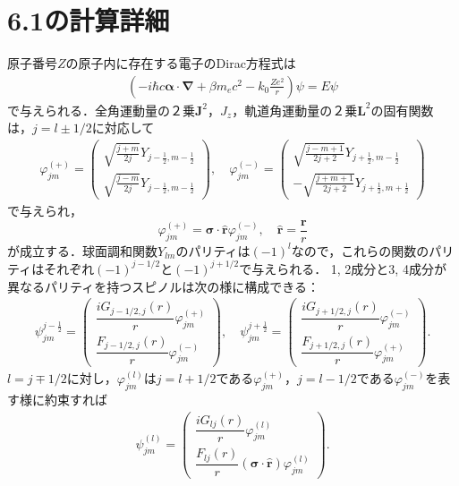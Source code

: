 \section*{6.1の計算詳細}
原子番号$Z$の原子内に存在する電子のDirac方程式は
\begin{align}
  \left( - i\hbar c\boldsymbol{\alpha}\cdot\boldsymbol{\nabla} + \beta m_ec^2 - k_0\frac{Ze^2}{r}\right)\psi=E\psi
  \label{Dirac_eq}
\end{align}
で与えられる．全角運動量の２乗$\boldsymbol{J}^2$，$J_z$，軌道角運動量の２乗$\boldsymbol{L}^2$の固有関数は，$j=l\pm 1/2$に対応して
\begin{align}
  \varphi_{jm}^{( + )} =
  \begin{pmatrix}
    \sqrt{\frac{j + m}{2j}}Y_{j - \frac{1}{2},m - \frac{1}{2}}\\
    \sqrt{\frac{j - m}{2j}}Y_{j - \frac{1}{2},m - \frac{1}{2}}
  \end{pmatrix}
  ,\quad\varphi_{jm}^{( - )} =
  \begin{pmatrix}
    \sqrt{\frac{j - m + 1}{2j + 2}}Y_{j + \frac{1}{2},m - \frac{1}{2}}\\
     - \sqrt{\frac{j + m + 1}{2j + 2}}Y_{j + \frac{1}{2},m + \frac{1}{2}}
  \end{pmatrix}
  \label{eigenfunc}
\end{align}
で与えられ，
\[\varphi_{jm}^{( + )} = \boldsymbol{\sigma}\cdot\hat{\boldsymbol{r}}\varphi_{jm}^{( - )}, \quad\hat{\boldsymbol{r}} = \frac{\boldsymbol{r}}{r}\]
が成立する．球面調和関数$Y_{lm}$のパリティは$( - 1)^l$なので，これらの関数のパリティはそれぞれ$( - 1)^{j - 1/2}$と$( - 1)^{j + 1/2}$で与えられる．
1, 2成分と3, 4成分が異なるパリティを持つスピノルは次の様に構成できる：
\begin{align}
  \psi_{jm}^{j - \frac{1}{2}}=
  \begin{pmatrix}
    \dfrac{iG_{j - 1/2,j}(r)}{r}\varphi_{jm}^{( + )} \\
    \dfrac{F_{j - 1/2,j}(r)}{r}\varphi_{jm}^{( - )}
  \end{pmatrix}
  ,\quad\psi_{jm}^{j + \frac{1}{2}}=
  \begin{pmatrix}
    \dfrac{iG_{j + 1/2,j}(r)}{r}\varphi_{jm}^{( - )} \\
    \dfrac{F_{j + 1/2,j}(r)}{r}\varphi_{jm}^{( + )}
  \end{pmatrix}
  .
\end{align}
$l=j\mp1/2$に対し，$\varphi_{jm}^{(l)}$は$j=l + 1/2$である$\varphi_{jm}^{( + )}$，$j=l - 1/2$である$\varphi_{jm}^{( - )}$を表す様に約束すれば
\begin{align}
  \psi_{jm}^{(l)}=
  \begin{pmatrix}
    \dfrac{iG_{lj}(r)}{r}\varphi_{jm}^{(l)} \\
    \dfrac{F_{lj}(r)}{r}(\boldsymbol{\sigma}\cdot\hat{\boldsymbol{r}})\varphi_{jm}^{(l)}
  \end{pmatrix}
  .\label{spinor_parity_l}
\end{align}
